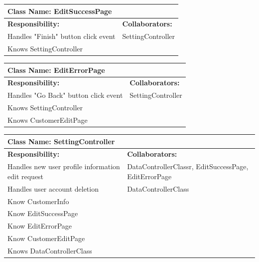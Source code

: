 \documentclass[]{article}
\begin{document}
	\begin{table}[H]
	\centering
	\begin{tabular}{|p{6cm}|p{6cm}|}
	\hline 
		\multicolumn{2}{|l|}{\textbf{Class Name: EditSuccessPage}} \\
	\hline
	\textbf{Responsibility:} & \textbf{Collaborators:} \\
	\hline 
	Handles "Finish" button click event  & SettingController\\ \hline 
	Knows SettingController &\\ \hline
	\end{tabular}
	\end{table}
	
	\begin{table}[H]
	\centering
	\begin{tabular}{|p{6cm}|p{6cm}|}
	\hline 
		\multicolumn{2}{|l|}{\textbf{Class Name: EditErrorPage}} \\
	\hline
	\textbf{Responsibility:} & \textbf{Collaborators:} \\
	\hline 
	Handles "Go Back" button click event  & SettingController\\ \hline 
	Knows SettingController &\\ \hline
	Knows CustomerEditPage &\\ \hline
	\end{tabular}
	\end{table}
	
	\begin{table}[H]
	\centering
	\begin{tabular}{|p{6cm}|p{6cm}|}
	\hline 
		\multicolumn{2}{|l|}{\textbf{Class Name: SettingController}} \\
	\hline
	\textbf{Responsibility:} & \textbf{Collaborators:} \\
	\hline
	Handles new user profile information edit request & DataControllerClassr, EditSuccessPage, EditErrorPage\\ \hline
	Handles user account deletion & DataControllerClass\\ \hline
	Know CustomerInfo & \\ \hline 
	Know EditSuccessPage & \\ \hline 
	Know EditErrorPage & \\ \hline
	Know CustomerEditPage & \\ \hline
	Knows DataControllerClass& \\ \hline
	\end{tabular}
	\end{table}
	
\end{document}
